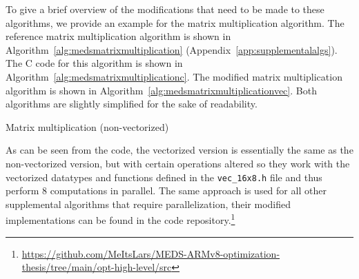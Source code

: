\documentclass[11pt,a4paper]{report}
\theoremstyle{definition}
\begin{document}
To give a brief overview of the modifications that need to be made to these algorithms, we provide an example for the matrix multiplication algorithm. The reference matrix multiplication algorithm is shown in Algorithm~\ref{alg:medsmatrixmultiplication} (Appendix~\ref{app:supplementalalgs}). The C code for this algorithm is shown in Algorithm~\ref{alg:medsmatrixmultiplicationc}. The modified matrix multiplication algorithm is shown in Algorithm~\ref{alg:medsmatrixmultiplicationvec}. Both algorithms are slightly simplified for the sake of readability.

\begin{algorithm}
  \caption{Matrix multiplication (non-vectorized)}
  \label{alg:medsmatrixmultiplicationc}
  
\end{algorithm}

As can be seen from the code, the vectorized version is essentially the same as the non-vectorized version, but with certain operations altered so they work with the vectorized datatypes and functions defined in the \texttt{vec\_16x8.h} file and thus perform 8 computations in
parallel. The same approach is used for all other supplemental algorithms that require parallelization, their modified implementations can be found in the code repository.\footnote{\url{https://github.com/MeItsLars/MEDS-ARMv8-optimization-thesis/tree/main/opt-high-level/src}}

\pagebreak
\end{document}
